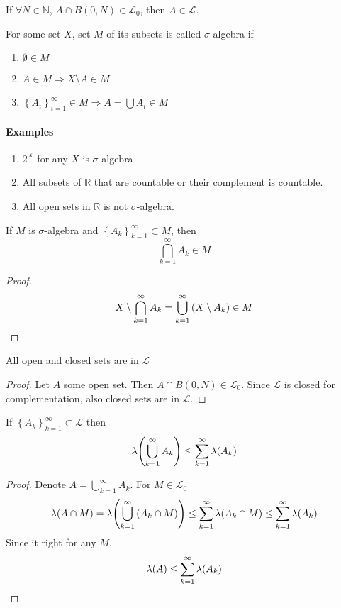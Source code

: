 \begin{prop}
	If $\forall N\in \mathbb{N}$, $A\cap B(0,N) \in \mathcal{L}_0$, then $A\in \mathcal{L}$.
\end{prop}

\begin{definition}
	For some set $X$, set $M$ of its subsets is called $\sigma$-algebra if
	\begin{enumerate}
		\item $\emptyset \in M$
		\item $A\in M \Rightarrow X\setminus A\in M$
		\item $\left\{ A_i \right\}_{i=1}^\infty \in M \Rightarrow A = \bigcup A_i \in M $
	\end{enumerate}
\end{definition}

\paragraph{Examples}
\begin{enumerate}
	\item $2^X$ for any $X$ is $\sigma$-algebra
	\item All subsets of $\mathbb{R}$ that are countable or their complement is countable.
	\item All open sets in $\mathbb{R}$ is not $\sigma$-algebra.
\end{enumerate}
\begin{prop}
	If $M$ is $\sigma$-algebra and  $\left\{ A_k \right\}_{k=1}^\infty \subset M$, then
	$$\bigcap_{k=1}^\infty A_k \in M$$
	\begin{proof}
		$$X \setminus \bigcap_{k=1}^\infty A_k = \bigcup_{k=1}^\infty \qty(X\setminus A_k) \in M$$
	\end{proof}
\end{prop}

\begin{prop}
	All open and closed sets are in $\mathcal{L}$
	\begin{proof}
		Let $A$ some open set. Then $A\cap B(0,N)\in \mathcal{L}_0$. Since $\mathcal{L}$ is closed for complementation, also closed sets are in $\mathcal{L}$.
	\end{proof}
\end{prop}

\begin{prop}
	If $\left\{ A_k \right\}_{k=1}^\infty \subset \mathcal{L}$ then
	$$\lambda\qty(\bigcup_{k=1}^\infty A_k) \leq \sum_{k=1}^\infty \lambda(A_k)$$
	\begin{proof}
		Denote $A=\bigcup_{k=1}^\infty A_k$. For $M\in \mathcal{L}_0$
		$$\lambda(A\cap M) = \lambda\qty(\bigcup_{k=1}^\infty \qty(A_k \cap M)) \leq \sum_{k=1}^\infty \lambda(A_k\cap M) \leq \sum_{k=1}^\infty \lambda(A_k)$$
		Since it right for any $M$, 
		$$\lambda\qty(A) \leq \sum_{k=1}^\infty \lambda(A_k)$$
	\end{proof}
\end{prop}

